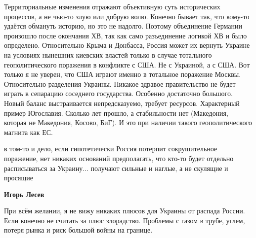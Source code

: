 \begin{itemize}
\begin{itemize}
\end{itemize} %


Территориальные изменения отражают объективную суть исторических процессов, а
не чью-то злую или добрую волю. Конечно бывает так, что кому-то удаётся
обмануть историю, но это не надолго. Поэтому объединение Германии произошло
после окончания ХВ, так как само разъединение логикой ХВ и было определено.
Относительно Крыма и Донбасса, Россия может их вернуть Украине на условиях
нынешних киевских властей только в случае тотального геополитического поражения
в конфликте с США. Не с Украиной, а с США. Вот только я не уверен, что США
играют именно в тотальное поражение Москвы. Относительно разделения Украины.
Никакое здравое правительство не будет играть в сепарацию соседнего
государства. Особенно достаточно большого. Новый баланс выстраивается
непредсказуемо, требует ресурсов. Характерный пример Югославия. Сколько лет
прошло, а стабильности нет (Македония, которая не Македония, Косово, БиГ). И
это при наличии такого геополитического магнита как ЕС.

\begin{itemize} %

в том-то и дело, если гипотетически Россия потерпит сокрушительное поражение,
нет никаких оснований предполагать, что кто-то будет отдельно расписываться за
Украину... получают сильные и наглые, а не скулящие и просящие

\textbf{Игорь Лесев} 

При всём желании, я не вижу никаких плюсов для Украины от распада России. Если
конечно не считать за плюс злорадство. Проблемы с газом в трубе, углем, потеря
рынка и риск большой войны на границе.

\end{itemize} %

\end{itemize} %
